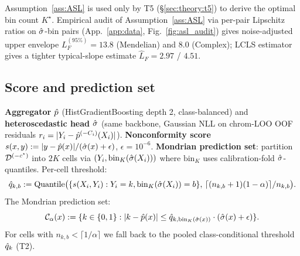 Assumption~\ref{ass:ASL} is used only by T5 (§\ref{sec:theory:t5}) to derive the optimal bin count $K^\star$. Empirical audit of Assumption~\ref{ass:ASL} via per-pair Lipschitz ratios on $\hat{\sigma}$-bin pairs (App.~\ref{app:data}, Fig.~\ref{fig:asl_audit}) gives noise-adjusted upper envelope $L_F^{(95\%)} = 13.8$ (Mendelian) and $8.0$ (Complex); LCLS estimator \citep{lcls2024lipschitz} gives a tighter typical-slope estimate $\hat L_F = 2.97$ / $4.51$.

\subsection{Score and prediction set}
\label{sec:formulation:score}

\textbf{Aggregator $\hat{p}$} (HistGradientBoosting depth 2, class-balanced) and \textbf{heteroscedastic head $\hat{\sigma}$} (same backbone, Gaussian NLL on chrom-LOO OOF residuals $r_i = |Y_i - \hat{p}^{(-C_i)}(X_i)|$).
\textbf{Nonconformity score} $s(x, y) := |y - \hat{p}(x)| / (\hat{\sigma}(x) + \epsilon)$, $\epsilon = 10^{-6}$.
\textbf{Mondrian prediction set}: partition $\mathcal{D}^{(-c^\star)}$ into $2K$ cells via $(Y_i, \mathrm{bin}_K(\hat{\sigma}(X_i)))$ where $\mathrm{bin}_K$ uses calibration-fold $\hat{\sigma}$-quantiles. Per-cell threshold:
\begin{equation}
\label{eq:qhat}
\hat{q}_{k, b} := \mathrm{Quantile}\bigl(\{s(X_i, Y_i) : Y_i = k, \mathrm{bin}_K(\hat{\sigma}(X_i)) = b\}, \, \lceil(n_{k,b} + 1)(1 - \alpha)\rceil / n_{k,b}\bigr).
\end{equation}
The Mondrian prediction set:
\begin{equation}
\label{eq:pset}
\mathcal{C}_\alpha(x) := \{k \in \{0, 1\} : |k - \hat{p}(x)| \leq \hat{q}_{k, \mathrm{bin}_K(\hat{\sigma}(x))} \cdot (\hat{\sigma}(x) + \epsilon)\}.
\end{equation}
For cells with $n_{k,b} < \lceil 1/\alpha \rceil$ we fall back to the pooled class-conditional threshold $\hat{q}_k$ (T2).
